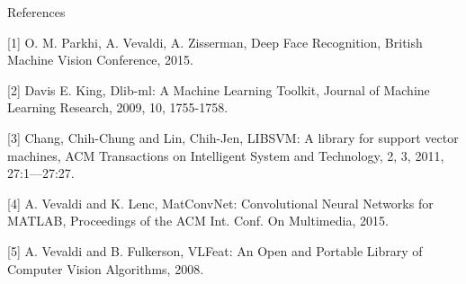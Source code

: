 \begin{tframe}{References}

[1] O. M. Parkhi, A. Vevaldi, A. Zisserman, Deep Face Recognition, British Machine Vision Conference, 2015.

\vspace{0.1in}

[2] Davis E. King, Dlib-ml: A Machine Learning Toolkit, Journal of Machine Learning Research, 2009, 10, 1755-1758.

\vspace{0.1in}

[3] Chang, Chih-Chung and Lin, Chih-Jen, LIBSVM: A library for support vector machines, ACM Transactions on Intelligent System and Technology, 2, 3, 2011, 27:1—27:27.

\vspace{0.1in}

[4] A. Vevaldi and K. Lenc, MatConvNet: Convolutional Neural Networks for MATLAB, Proceedings of the ACM Int. Conf. On Multimedia, 2015.

\vspace{0.1in}

[5] A. Vevaldi and B. Fulkerson, VLFeat: An Open and Portable Library of Computer Vision Algorithms, 2008.


\end{tframe}
